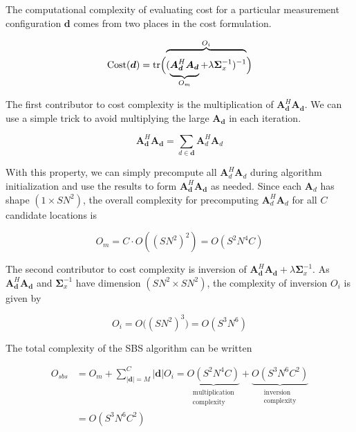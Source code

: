 \documentclass{article}
\begin{document}
The computational complexity of evaluating cost for a particular measurement
configuration $\bm{d}$ comes from two places in the cost formulation.

\vspace{-0.2 in}
$$
  \text{Cost}(\bm{d}) = \text{tr} \Bigl(
  \overbrace{\vphantom{\rule[1.5em]{0pt}{0pt}}
(\underbrace{\vphantom{\rule[-0.5em]{0pt}{0pt}} \bm{A}_{\bm{d}}^H \bm{A}_{\bm{d}}}_{O_m}
+\lambda \bm \Sigma_x^{-1})^{-1}
}^{O_i}
\Bigr)
$$

The first contributor to cost complexity is the multiplication of
$\bm{A}^H_{\bm{d}}\bm{A}_{\bm{d}}$.  We can use a simple trick to avoid
multiplying the large $\bm{A}_{\bm{d}}$ in each iteration.

$$
\bm{A}^H_{\bm{d}} \bm{A}_{\bm{d}} = \sum_{d \in \bm{d}} \bm{A}^H_{d} \bm{A}_{d}
$$

With this property, we can simply precompute all $\bm{A}^H_{d}\bm{A}_{d}$ during
algorithm initialization and use the results to form
$\bm{A}^H_{\bm{d}}\bm{A}_{\bm{d}}$ as needed.
Since each $\bm{A}_d$ has shape $(1 \times SN^2)$, the overall complexity for precomputing $\bm{A}^H_d \bm{A}_d$ for all $C$ candidate locations is

$$
O_m = C \cdot O((SN^2)^2) = O(S^2N^4C)
$$

The second contributor to cost complexity is inversion of $\bm{A}^H_{\bm{d}}
\bm{A}_{\bm{d}} + \lambda\bm \Sigma_x^{-1}$.
As $\bm{A}^H_{\bm{d}} \bm{A}_{\bm{d}}$ and $\bm \Sigma_x^{-1}$ have dimension $(SN^2
\times SN^2)$, the complexity of inversion $O_i$ is given by

$$O_i = O\big( (SN^2)^3 \big) = O(S^3N^6)$$

The total complexity of the SBS algorithm can be written

\vspace{-0.2 in}
\begin{align*}
  O_{sbs} &= O_m + \sum_{|\bm{d}| = M}^C |\bm{d}| O_i =
  \underbrace{
  O(S^2N^4C)
  }_{\substack{\text{multiplication}\\ \text{complexity}}}
  +
  \underbrace{
  O(S^3N^6C^2)
  }_{\substack{\text{inversion}\\ \text{complexity}}} \\
  &= O(S^3N^6C^2)
\end{align*}

\end{document}
